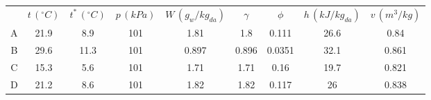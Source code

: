 \begin{tabular}{ccccccccc}
\hline
& $t\,\left(^{\circ} C\right)$ & $t^*\,\left(^{\circ} C\right)$ & $p \,\left(kPa\right)$ & $W\,\left(g_{w}/kg_{da}\right)$ & $\gamma$ & $\phi$ & $h\,\left(kJ/kg_{da}\right)$ & $v\,\left(m^3/kg\right)$ \\
A &  21.9 &   8.9 &   101 &  1.81 &   1.8 & 0.111 &  26.6 &  0.84 \\
B &  29.6 &  11.3 &   101 & 0.897 & 0.896 & 0.0351 &  32.1 & 0.861 \\
C &  15.3 &   5.6 &   101 &  1.71 &  1.71 &  0.16 &  19.7 & 0.821 \\
D &  21.2 &   8.6 &   101 &  1.82 &  1.82 & 0.117 &    26 & 0.838 \\
\hline
\end{tabular}
